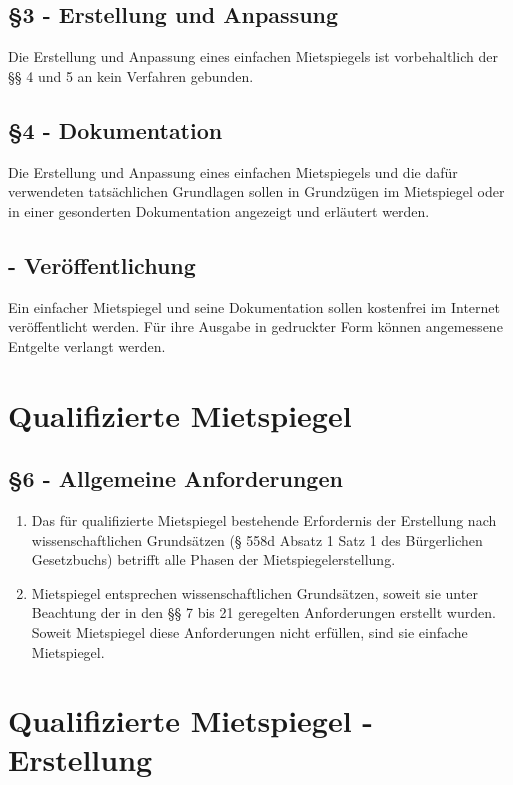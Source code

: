     \subsection{\S 3 - Erstellung und Anpassung}
    Die Erstellung und Anpassung eines einfachen Mietspiegels ist vorbehaltlich der §§ 4 und 5 an kein Verfahren gebunden.
    \subsection{\S 4 - Dokumentation}
    Die Erstellung und Anpassung eines einfachen Mietspiegels und die dafür verwendeten tatsächlichen Grundlagen sollen in Grundzügen im Mietspiegel oder in einer gesonderten Dokumentation angezeigt und erläutert werden.
    \subsection{\5 - Veröffentlichung}
    Ein einfacher Mietspiegel und seine Dokumentation sollen kostenfrei im Internet veröffentlicht werden. Für ihre Ausgabe in gedruckter Form können angemessene Entgelte verlangt werden.
        
\section{Qualifizierte Mietspiegel}
    \subsection{\S 6 - Allgemeine Anforderungen}
    \begin{enumerate}[label=(\arabic*)]
        \item Das für qualifizierte Mietspiegel bestehende Erfordernis der Erstellung nach wissenschaftlichen Grundsätzen (§ 558d Absatz 1 Satz 1 des Bürgerlichen Gesetzbuchs) betrifft alle Phasen der Mietspiegelerstellung.
        \item Mietspiegel entsprechen wissenschaftlichen Grundsätzen, soweit sie unter Beachtung der in den §§ 7 bis 21 geregelten Anforderungen erstellt wurden. Soweit Mietspiegel diese Anforderungen nicht erfüllen, sind sie einfache Mietspiegel.
    \end{enumerate}
\section{Qualifizierte Mietspiegel - Erstellung}
